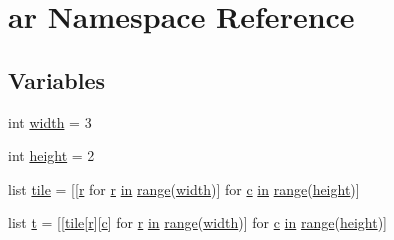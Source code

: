 \hypertarget{namespacear}{}\section{ar Namespace Reference}
\label{namespacear}
\subsection*{Variables}
\begin{DoxyCompactItemize}
\item 
int \mbox{\hyperlink{namespacear_a5f494bd55c46dd558e0b0ddd7d05d19d}{width}} = 3
\item 
int \mbox{\hyperlink{namespacear_a73d70a34d44667e5e721d311f1c56608}{height}} = 2
\item 
list \mbox{\hyperlink{namespacear_a66c6c345626b098fb365cdde45b3e604}{tile}} = \mbox{[}\mbox{[}\mbox{\hyperlink{_s_d_l__opengl_8h_a42ce7cdc612e53abee15043f80220d97}{r}} for \mbox{\hyperlink{_s_d_l__opengl_8h_a42ce7cdc612e53abee15043f80220d97}{r}} \mbox{\hyperlink{_s_d_l__opengl__glext_8h_a83ad0ee7f1e06b59c90271716e689080}{in}} \mbox{\hyperlink{_s_d_l__opengl__glext_8h_a73b00379db2c7ac5e30a3aa2954a50ee}{range}}(\mbox{\hyperlink{_s_d_l__opengl_8h_a9a82cf3caff84cabc4598e2619faac17}{width}})\mbox{]} for \mbox{\hyperlink{_s_d_l__opengl__glext_8h_a1f2d7f8147412c43ba2303a56f97ee73}{c}} \mbox{\hyperlink{_s_d_l__opengl__glext_8h_a83ad0ee7f1e06b59c90271716e689080}{in}} \mbox{\hyperlink{_s_d_l__opengl__glext_8h_a73b00379db2c7ac5e30a3aa2954a50ee}{range}}(\mbox{\hyperlink{_s_d_l__opengl_8h_aa352f2804b9902ac30769c00dde75d5f}{height}})\mbox{]}
\item 
list \mbox{\hyperlink{namespacear_a5d9cc14833c739838257a4cc1180a294}{t}} = \mbox{[}\mbox{[}\mbox{\hyperlink{namespacear_a66c6c345626b098fb365cdde45b3e604}{tile}}\mbox{[}\mbox{\hyperlink{_s_d_l__opengl_8h_a42ce7cdc612e53abee15043f80220d97}{r}}\mbox{]}\mbox{[}\mbox{\hyperlink{_s_d_l__opengl__glext_8h_a1f2d7f8147412c43ba2303a56f97ee73}{c}}\mbox{]} for \mbox{\hyperlink{_s_d_l__opengl_8h_a42ce7cdc612e53abee15043f80220d97}{r}} \mbox{\hyperlink{_s_d_l__opengl__glext_8h_a83ad0ee7f1e06b59c90271716e689080}{in}} \mbox{\hyperlink{_s_d_l__opengl__glext_8h_a73b00379db2c7ac5e30a3aa2954a50ee}{range}}(\mbox{\hyperlink{_s_d_l__opengl_8h_a9a82cf3caff84cabc4598e2619faac17}{width}})\mbox{]} for \mbox{\hyperlink{_s_d_l__opengl__glext_8h_a1f2d7f8147412c43ba2303a56f97ee73}{c}} \mbox{\hyperlink{_s_d_l__opengl__glext_8h_a83ad0ee7f1e06b59c90271716e689080}{in}} \mbox{\hyperlink{_s_d_l__opengl__glext_8h_a73b00379db2c7ac5e30a3aa2954a50ee}{range}}(\mbox{\hyperlink{_s_d_l__opengl_8h_aa352f2804b9902ac30769c00dde75d5f}{height}})\mbox{]}
\end{DoxyCompactItemize}


